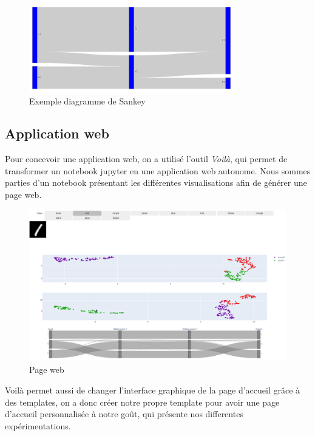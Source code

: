 \documentclass[oneside,13pt,a4paper]{report}
\begin{document}
\begin{figure}[!h]
\center
\includegraphics[width=0.8\textwidth]{img/sankey.png}
\caption{Exemple diagramme de Sankey}
\end{figure}

\subsection{Application web}
Pour concevoir une application web, on a utilisé l'outil \textit{Voilà}, qui permet de transformer un notebook jupyter en une application web autonome. Nous sommes parties d'un notebook présentant les différentes visualisations afin de générer une page web.

\begin{figure}[!h]
    \center
    \includegraphics[width=1.0\textwidth]{img/umap-sankey2.png}
    \caption{Page web}
\end{figure}

Voilà permet aussi de changer l'interface graphique de la page d'accueil grâce à des templates, on a donc créer notre propre template pour avoir une page d'accueil personnalisée à notre goût, qui présente nos differentes expérimentations.
\end{document}
